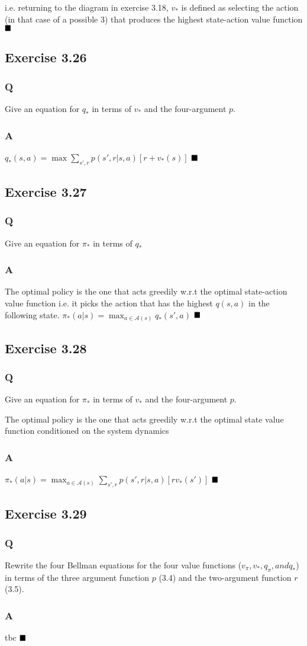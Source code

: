 i.e. returning to the diagram in exercise 3.18, $v_*$ is defined as selecting the action (in that case of a possible 3) that produces the highest state-action value function
$
\hfill \blacksquare
$

\subsection{Exercise 3.26}
\subsubsection*{Q}
Give an equation for $q_*$ in terms of $v_*$ and the four-argument $p$.

\subsubsection*{A}
$
q_*(s,a) = \max \sum_{s', r} p(s', r | s, a)[r + v_*(s)]
$
$
\hfill \blacksquare
$

\subsection{Exercise 3.27}
\subsubsection*{Q}
Give an equation for $\pi_*$ in terms of $q_*$

\subsubsection*{A}
The optimal policy is the one that acts greedily w.r.t the optimal state-action value function i.e. it picks the action that has the highest $q(s,a)$ in the following state.
$
\pi_*(a|s) = \max_{a \in \mathcal{A}(s)} q_*(s',a)
$
$
\hfill \blacksquare
$

\subsection{Exercise 3.28}
\subsubsection*{Q}
Give an equation for $\pi_*$ in terms of $v_*$ and the four-argument $p$.

The optimal policy is the one that acts greedily w.r.t the optimal state value function conditioned on the system dynamics
\subsubsection*{A}
$
\pi_*(a|s) = \max_{a \in \mathcal{A}(s)} \sum_{s', r} p(s', r | s, a)[r  v_*(s')]
$
$
\hfill \blacksquare
$

\subsection{Exercise 3.29}
\subsubsection*{Q}
Rewrite the four Bellman equations for the four value functions ($v_\pi, v_*, q_\pi,and q_*$) in terms of the three argument function $p$ (3.4) and the two-argument function $r$ (3.5).

\subsubsection*{A}
tbc
$
\hfill \blacksquare
$